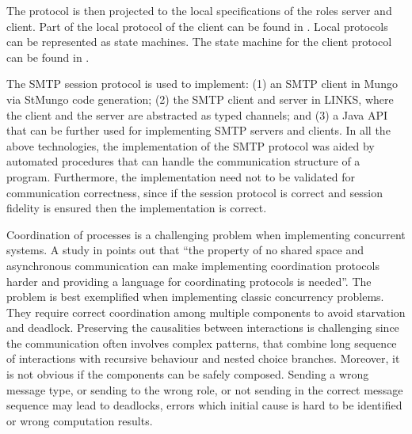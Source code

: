 The protocol is then projected to the local specifications
of the roles server and client. Part of the local protocol
of the client can be found in .
Local protocols can be represented as state machines. The state
machine for the client protocol can be found in .

The SMTP session protocol is used to implement:
(1) an SMTP client in Mungo via StMungo code generation;
(2) the SMTP client and server in LINKS, where the client
and the server are abstracted as typed channels; and
(3) a Java API that can be further used for implementing SMTP servers and clients.
In all the above technologies,
the implementation of the SMTP protocol was
aided by automated procedures that can handle
the communication structure of a program. Furthermore,
the implementation need not to be validated for
communication correctness, since if the session protocol
is correct and session fidelity is ensured then
the implementation is correct.




Coordination of processes is a challenging problem
when implementing concurrent systems.
A study in \cite{ActorCoordinationStudy} points out that
``the property of no shared space and asynchronous communication
can make implementing coordination protocols harder and
providing a language for coordinating protocols is needed''.
The problem is best exemplified when implementing
classic concurrency problems. They require correct coordination
among multiple components to avoid starvation and deadlock.
Preserving the causalities between interactions is
challenging since the communication often involves complex patterns,
that combine long sequence of interactions with recursive behaviour
and nested choice branches. Moreover, it is not obvious if the components can be safely composed.
Sending a wrong message type, or sending to the wrong role,
or not sending in the correct message sequence may lead to deadlocks,
errors which initial cause is hard to be identified or wrong computation results.

